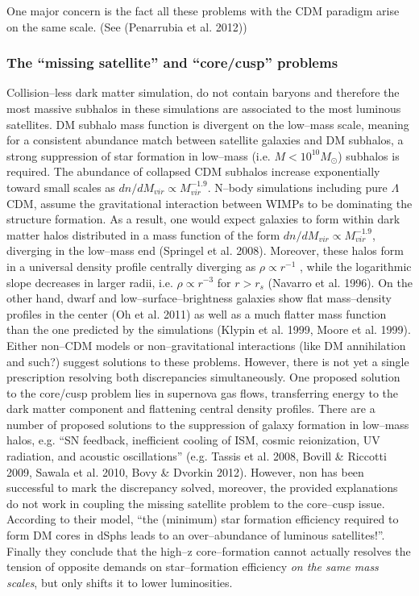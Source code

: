 \documentclass[paper=a4, fontsize=11pt]{scrartcl} %
\numberwithin{equation}{section} %
\numberwithin{figure}{section} %
\numberwithin{table}{section} %
\begin{document}
One major concern is the fact all these problems with the CDM paradigm arise on the same scale. (See ({Penarrubia et al. 2012}))
\subsubsection*{The ``missing satellite'' and ``core/cusp'' problems}
Collision--less dark matter simulation, do not contain baryons and therefore the most massive subhalos in these simulations are associated to the most luminous satellites. DM subhalo mass function is divergent on the low--mass scale, meaning for a consistent abundance match between satellite galaxies and DM subhalos, a strong suppression of star formation in low--mass (i.e. $M<10^{10} M_\odot$) subhalos is required. 
The abundance of collapsed CDM subhalos increase exponentially toward small scales as $dn/dM_{vir} \propto M_{vir}^{-1.9}$.
N--body simulations including pure $\Lambda$CDM, assume the gravitational interaction between WIMPs to be dominating the structure formation. As a result, one would expect galaxies to form within dark matter halos distributed in a mass function of the form $dn/dM_{vir} \propto M_{vir}^{-1.9}$, diverging in the low--mass end (Springel et al. 2008). Moreover, these halos form in a universal density profile centrally diverging as $\rho \propto r^{-1}$ , while the logarithmic slope decreases in larger radii, i.e. $\rho \propto r^{-3}$ for $r>r_s$ ({Navarro et al. 1996}). On the other hand, dwarf and low--surface--brightness galaxies show flat mass--density profiles in the center ({Oh et al. 2011}) as well as a much flatter mass function than the one predicted by the simulations ({Klypin et al. 1999, Moore et al. 1999}). Either non--CDM models or non--gravitational interactions (like DM annihilation and such?) suggest solutions to these problems. However, there is not yet a single prescription resolving both discrepancies simultaneously. One proposed solution to the core/cusp problem lies in supernova gas flows, transferring energy to the dark matter component and flattening central density profiles. There are a number of proposed solutions to the suppression of galaxy formation in low--mass halos, e.g. ``SN feedback, inefficient cooling of ISM, cosmic reionization, UV radiation, and acoustic oscillations'' (e.g. Tassis et al. 2008, Bovill \& Riccotti 2009, Sawala et al. 2010, Bovy \& Dvorkin 2012). However, non has been successful to mark the discrepancy solved, moreover, the provided explanations do not work in coupling the missing satellite problem to the core--cusp issue. According to their model, ``the (minimum) star formation efficiency required to form DM cores in dSphs leads to an over--abundance of luminous satellites!''. Finally they conclude that the high--z core--formation cannot actually resolves the tension of opposite demands on star--formation efficiency \emph{on the same mass scales}, but only shifts it to lower luminosities.
\end{document}
